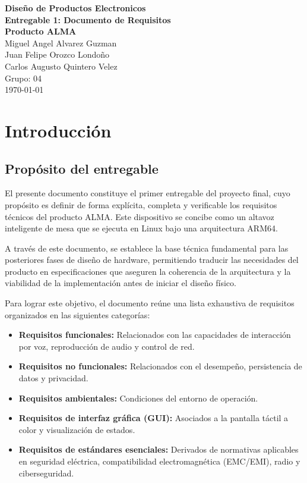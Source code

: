 \documentclass[%
	paper=a4,				%
	twoside=false,				%
	parskip=half,				%
	chapterprefix=false, 		%
	10pt,						%
	headings=normal,			%
	bibliography=totoc,			%
	listof=totoc,				%
	titlepage=on,				%
	captions=tableabove,		%
	draft=false,				%
]{scrbook}%
\begin{document}
\begin{titlepage}
    \centering
    \vspace*{2cm}
    {\Large \textbf{Diseño de Productos Electronicos}} \\[1cm] %
    {\Huge \textbf{Entregable 1: Documento de Requisitos}} \\[0.5cm]
    {\LARGE \textbf{Producto ALMA}} \\[1.5cm]
    {\Large Miguel Angel Alvarez Guzman} \\[0.5cm]
    {\Large Juan Felipe Orozco Londoño} \\[0.5cm]
    {\Large Carlos Augusto Quintero Velez} \\[0.5cm]
    {\large Grupo: 04} \\[2cm] %
    \vfill
    {\large \today}
\end{titlepage}

\tableofcontents
\listoftables

\chapter{Introducción}

\section{Propósito del entregable}
El presente documento constituye el primer entregable del proyecto final, cuyo propósito es definir de forma explícita, completa y verificable los requisitos técnicos del producto ALMA. Este dispositivo se concibe como un altavoz inteligente de mesa que se ejecuta en Linux bajo una arquitectura ARM64.

A través de este documento, se establece la base técnica fundamental para las posteriores fases de diseño de hardware, permitiendo traducir las necesidades del producto en especificaciones que aseguren la coherencia de la arquitectura y la viabilidad de la implementación antes de iniciar el diseño físico. 

Para lograr este objetivo, el documento reúne una lista exhaustiva de requisitos organizados en las siguientes categorías:
\begin{itemize}
    \item \textbf{Requisitos funcionales:} Relacionados con las capacidades de interacción por voz, reproducción de audio y control de red.
    \item \textbf{Requisitos no funcionales:} Relacionados con el desempeño, persistencia de datos y privacidad.
    \item \textbf{Requisitos ambientales:} Condiciones del entorno de operación.
    \item \textbf{Requisitos de interfaz gráfica (GUI):} Asociados a la pantalla táctil a color y visualización de estados.
    \item \textbf{Requisitos de estándares esenciales:} Derivados de normativas aplicables en seguridad eléctrica, compatibilidad electromagnética (EMC/EMI), radio y ciberseguridad.
\end{itemize}
\end{document}
